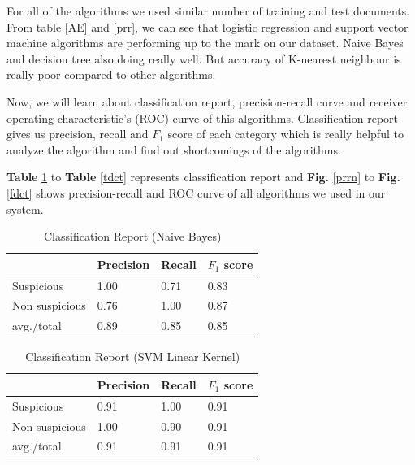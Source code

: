 For all of the algorithms we used similar number of training and test documents. From table \ref{AE} and \ref{prr}, we can see that logistic regression and support vector machine algorithms are performing up to the mark on our dataset. Naive Bayes and decision tree also doing really well. But accuracy of K-nearest neighbour is really poor compared to other algorithms. 

Now, we will learn about classification report, precision-recall curve and receiver operating characteristic's (ROC) curve of this algorithms. Classification report gives us precision, recall and $F_1$ score of each category which is really helpful to analyze the algorithm
and find out shortcomings of the algorithms.
\par
\textbf{Table} \ref{NBC} to \textbf{Table} \ref{tdct} represents classification report and \textbf{Fig.} \ref{prrn} to \textbf{Fig.} \ref{fdct} shows precision-recall and ROC curve of all algorithms we used in our system.

\renewcommand{\arraystretch}{1.1}
\begin{table}[h!]
\begin{center}
\caption{Classification Report (Naive Bayes)}
\begin{tabular}{|m{2.8cm} | m{1.5cm}| m{1.3cm}| m{1.5cm}|}
\hline
     & Precision & Recall & $F_1$ score\\
\hline
     Suspicious & 1.00 & 0.71 & 0.83\\
\hline 
     Non suspicious  & 0.76 & 1.00 & 0.87\\
\hline 
     avg./total & 0.89 & 0.85 & 0.85\\
\hline
\end{tabular}
\label{NBC}
\end{center}
\end{table}

\begin{table}[h!]
\begin{center}
\caption{Classification Report (SVM Linear Kernel)}
\begin{tabular}{|m{2.8cm} | m{1.5cm}| m{1.3cm}| m{1.5cm}|}
\hline
     & Precision & Recall & $F_1$ score\\
\hline
     Suspicious & 0.91 & 1.00 & 0.91\\
\hline 
     Non suspicious  & 1.00 & 0.90 & 0.91\\
\hline 
     avg./total & 0.91 & 0.91 & 0.91\\
\hline
\end{tabular}
\label{SVML}
\end{center}
\end{table}

